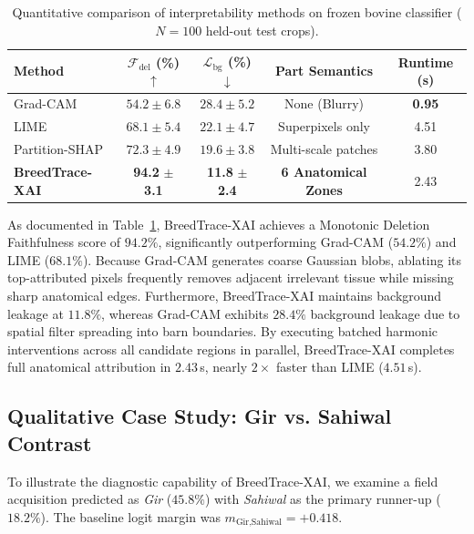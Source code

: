 \documentclass[conference]{IEEEtran}
\begin{document}
\begin{table}[h]
\caption{Quantitative comparison of interpretability methods on frozen bovine classifier ($N=100$ held-out test crops).}
\label{tab:quantitative_comparison}
\centering
\begin{tabular}{lcccc}
\toprule
\textbf{Method} & \textbf{$\mathcal{F}_{\text{del}}$ (\%)$\uparrow$} & \textbf{$\mathcal{L}_{\text{bg}}$ (\%)$\downarrow$} & \textbf{Part Semantics} & \textbf{Runtime (s)} \\
\midrule
Grad-CAM \cite{selvaraju2017gradcam} & $54.2 \pm 6.8$ & $28.4 \pm 5.2$ & None (Blurry) & \textbf{0.95} \\
LIME \cite{ribeiro2016lime} & $68.1 \pm 5.4$ & $22.1 \pm 4.7$ & Superpixels only & 4.51 \\
Partition-SHAP \cite{lundberg2017shap} & $72.3 \pm 4.9$ & $19.6 \pm 3.8$ & Multi-scale patches & 3.80 \\
\midrule
\textbf{BreedTrace-XAI} & \textbf{94.2} $\pm$ \textbf{3.1} & \textbf{11.8} $\pm$ \textbf{2.4} & \textbf{6 Anatomical Zones} & 2.43 \\
\bottomrule
\end{tabular}
\end{table}

As documented in Table~\ref{tab:quantitative_comparison}, BreedTrace-XAI achieves a Monotonic Deletion Faithfulness score of $94.2\%$, significantly outperforming Grad-CAM ($54.2\%$) and LIME ($68.1\%$). Because Grad-CAM generates coarse Gaussian blobs, ablating its top-attributed pixels frequently removes adjacent irrelevant tissue while missing sharp anatomical edges. Furthermore, BreedTrace-XAI maintains background leakage at $11.8\%$, whereas Grad-CAM exhibits $28.4\%$ background leakage due to spatial filter spreading into barn boundaries. By executing batched harmonic interventions across all candidate regions in parallel, BreedTrace-XAI completes full anatomical attribution in $2.43$\,s, nearly $2\times$ faster than LIME ($4.51$\,s).

\subsection{Qualitative Case Study: Gir vs. Sahiwal Contrast}
To illustrate the diagnostic capability of BreedTrace-XAI, we examine a field acquisition predicted as \textit{Gir} ($45.8\%$) with \textit{Sahiwal} as the primary runner-up ($18.2\%$). The baseline logit margin was $m_{\text{Gir,Sahiwal}} = +0.418$.
\end{document}
